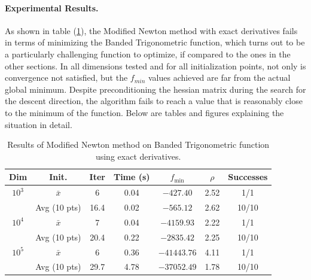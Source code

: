 \documentclass[a4paper,12pt]{article}
\begin{document}
	\paragraph{Experimental Results.} As shown in table (\ref{tab:banded_exact}), the Modified Newton method with exact derivatives fails in terms of minimizing the Banded Trigonometric function, which turns out to be a particularly challenging function to optimize, if compared to the ones in the other sections. In all dimensions tested and for all initialization points, not only is convergence not satisfied, but the $f_{min}$ values achieved are far from the actual global minimum. Despite preconditioning the hessian matrix during the search for the descent direction, the algorithm fails to reach a value that is reasonably close to the minimum of the function. Below are tables and figures explaining the situation in detail.
	
	\begin{table}[H]%
		\centering
		\renewcommand{\arraystretch}{1.2}
		\begin{tabular}{|c|c|c|c|c|c|c|}
			\hline
			\textbf{Dim} & \textbf{Init.} & \textbf{Iter} & \textbf{Time (s)} & \textbf{$f_{\min}$} & \textbf{$\rho$} & \textbf{Successes} \\
			\hline
			$10^3$   & $\bar{x}$        & 6    & 0.04 & $-427.40$     & 2.52 & 1/1 \\
			& Avg (10 pts)     & 16.4 & 0.02 & $-565.12$  & 2.62  & 10/10 \\
			\hline
			$10^4$   & $\bar{x}$        & 7    & 0.04 & $-4159.93$    & 2.22 & 1/1 \\
			& Avg (10 pts)     & 20.4 & 0.22 & $-2835.42$    & 2.25 & 10/10 \\
			\hline
			$10^5$   & $\bar{x}$  & 6    & 0.36 & $-41443.76$   & 4.11 & 1/1 \\
			& Avg (10 pts)     & 29.7 & 4.78 & $-37052.49$   & 1.78 & 10/10 \\
			\hline
		\end{tabular}
		\label{tab:banded_exact}
		\caption{Results of Modified Newton method on Banded Trigonometric function using exact derivatives.}
	\end{table}
	
\end{document}
